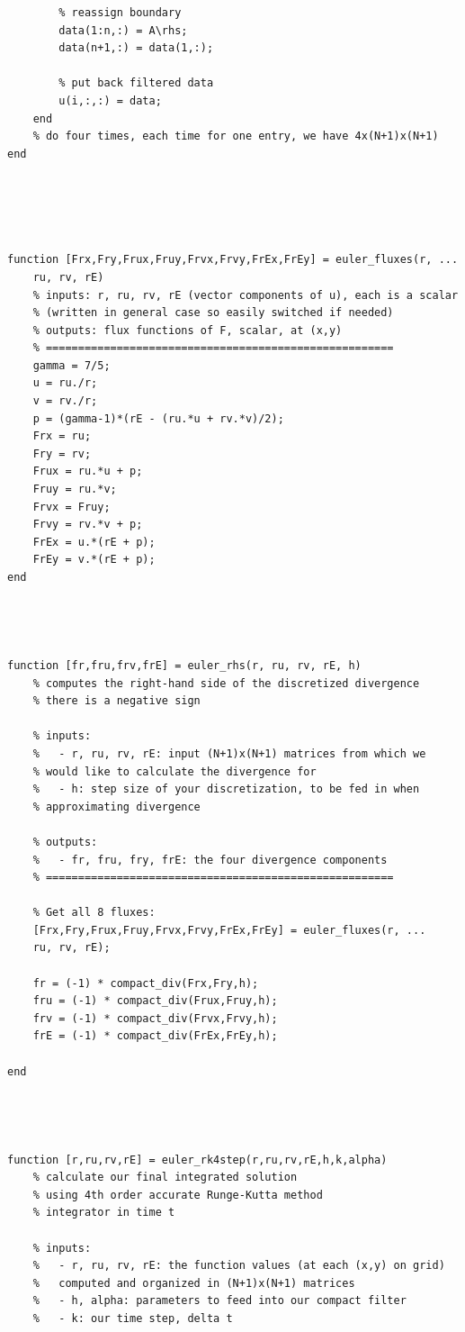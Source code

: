 \documentclass[12pt]{article}
\begin{document}
\begin{verbatim}
        % reassign boundary
        data(1:n,:) = A\rhs;
        data(n+1,:) = data(1,:);

        % put back filtered data
        u(i,:,:) = data;
    end
    % do four times, each time for one entry, we have 4x(N+1)x(N+1)
end





function [Frx,Fry,Frux,Fruy,Frvx,Frvy,FrEx,FrEy] = euler_fluxes(r, ...
    ru, rv, rE)
    % inputs: r, ru, rv, rE (vector components of u), each is a scalar
    % (written in general case so easily switched if needed)
    % outputs: flux functions of F, scalar, at (x,y)
    % ======================================================
    gamma = 7/5;
    u = ru./r;
    v = rv./r;
    p = (gamma-1)*(rE - (ru.*u + rv.*v)/2);
    Frx = ru;
    Fry = rv;
    Frux = ru.*u + p;
    Fruy = ru.*v;
    Frvx = Fruy;
    Frvy = rv.*v + p;
    FrEx = u.*(rE + p);
    FrEy = v.*(rE + p);
end




function [fr,fru,frv,frE] = euler_rhs(r, ru, rv, rE, h)
    % computes the right-hand side of the discretized divergence
    % there is a negative sign

    % inputs:
    %   - r, ru, rv, rE: input (N+1)x(N+1) matrices from which we
    % would like to calculate the divergence for
    %   - h: step size of your discretization, to be fed in when
    % approximating divergence

    % outputs:
    %   - fr, fru, fry, frE: the four divergence components
    % ======================================================

    % Get all 8 fluxes:
    [Frx,Fry,Frux,Fruy,Frvx,Frvy,FrEx,FrEy] = euler_fluxes(r, ...
    ru, rv, rE);

    fr = (-1) * compact_div(Frx,Fry,h);
    fru = (-1) * compact_div(Frux,Fruy,h);
    frv = (-1) * compact_div(Frvx,Frvy,h);
    frE = (-1) * compact_div(FrEx,FrEy,h);

end




function [r,ru,rv,rE] = euler_rk4step(r,ru,rv,rE,h,k,alpha)
    % calculate our final integrated solution
    % using 4th order accurate Runge-Kutta method
    % integrator in time t

    % inputs:
    %   - r, ru, rv, rE: the function values (at each (x,y) on grid)
    %   computed and organized in (N+1)x(N+1) matrices
    %   - h, alpha: parameters to feed into our compact filter
    %   - k: our time step, delta t


\end{verbatim}
\end{document}
